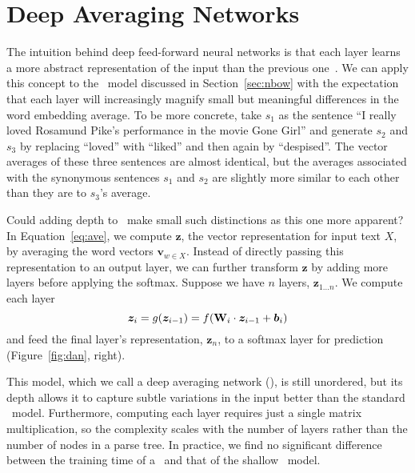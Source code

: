 \section{Deep Averaging Networks}\label{sec:dan}






The intuition behind deep feed-forward neural networks is that each layer learns
a more abstract representation of the input than the previous
one~\cite{bengio2013representation}. We can apply this concept to the
\nbow\ model discussed in Section~\ref{sec:nbow} with the expectation that each
layer will increasingly magnify small but meaningful differences in the word
embedding average. To be more concrete, take $s_1$ as the sentence ``I really
loved Rosamund Pike's performance in the movie Gone Girl'' and generate $s_2$
and $s_3$ by replacing ``loved'' with ``liked'' and then again by
``despised''. The vector averages of these three sentences are almost
identical, but the averages associated with the synonymous sentences $s_1$ and
$s_2$ are slightly more similar to each other than they are to $s_3$'s average.







Could adding depth to \nbow\ make small such distinctions 
as this one more apparent? In Equation~\ref{eq:ave}, we compute
$\boldsymbol{z}$, the vector representation for input text $X$, by
averaging the word vectors $\boldsymbol{v}_{w \in X}$. Instead of
directly passing this representation to an output layer, we can
further transform $\boldsymbol{z}$ by adding more layers before
applying the softmax. Suppose we have $n$ layers,
$\boldsymbol{z}_{1\dots n}$. We compute each layer 
\begin{equation}
\label{eq:dan}
	\boldsymbol{z}_i = g(\boldsymbol{z}_{i - 1}) = f(\text{\textbf{W}}_i\cdot \boldsymbol{z}_{i - 1} + \boldsymbol{b}_i)
\end{equation}
and feed the final layer's representation, $\boldsymbol{z}_n$, to a softmax
layer for prediction (Figure~\ref{fig:dan}, right).

This model, which we call a deep averaging network (\dan), is still unordered,
but its depth allows it to capture subtle variations in the input better than
the standard \nbow\ model. Furthermore, computing each layer requires just a
single matrix multiplication, so the complexity scales with the number of layers
rather than the number of nodes in a parse tree. In practice, we find no
significant difference between the training time of a \dan\ and that of the
shallow \nbow\ model.

